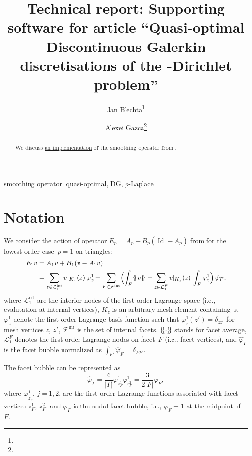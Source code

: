\documentclass[oneeqnum]{siamart220329}
\title{%
  Technical report: Supporting software for article
  ``Quasi-optimal Discontinuous Galerkin discretisations of the \mathp-Dirichlet problem''
}
\author{%
    Jan Blechta\thanks{\email{blechta@karlin.mff.cuni.cz}}
    \and
    Alexei Gazca\thanks{\email{alexei.gazca@mathematik.uni-freiburg.de}}
}
\newcommand*{\ldblbrace}{\{\mskip-5mu\{}
\newcommand*{\rdblbrace}{\}\mskip-5mu\}}
\begin{document}
\maketitle


\begin{abstract}
  We discuss \href{https://github.com/blechta/quasioptimal-dg-p-laplace}{an
  implementation} of the smoothing operator from
  \cite{veeser-zanotti-ii,veeser-zanotti-iii}.
\end{abstract}


\begin{keywords}
  smoothing operator, quasi-optimal, DG, $p$-Laplace
\end{keywords}




\tableofcontents


\section{Notation}
%
We consider the action of operator $E_p = A_p - B_p(\operatorname{Id}{}-A_p)$ from
\cite{veeser-zanotti-ii,veeser-zanotti-iii} for the lowest-order case~$p=1$
on triangles:
%
\begin{align*}
  E_1 v
  & = A_1 v + B_1 (v - A_1 v) \\
  & = \sum_{z\in\mathcal{L}^{\mathrm{int}}_1} v|_{K_z}(z) \, \varphi^1_z
    + \sum_{F\in \mathcal{F}^{\mathrm{int}}} \Bigl( \int_F \ldblbrace v
        \rdblbrace - \sum_{z\in\mathcal{L}^F_1} v|_{K_z}(z) \, \int_F \varphi_z^1
        \Bigr) \, \hat\varphi_F,
\end{align*}
%
where $\mathcal{L}^{\mathrm{int}}_1$ are the interior nodes of the first-order
Lagrange space (i.e., evalutation at internal vertices),
$K_z$ is an arbitrary mesh element containing~$z$,
$\varphi^1_z$ denote the first-order Lagrange basis function such that $\varphi^1_z(z')=\delta_{zz'}$ for mesh vertices $z$, $z'$,
$\mathcal{F}^{\mathrm{int}}$ is the set of internal facets,
$\ldblbrace\cdot\rdblbrace$ stands for facet average,
$\mathcal{L}^F_1$ denotes the first-order Lagrange nodes on facet~$F$ (i.e., facet vertices),
and
$\hat\varphi_F$ is the facet bubble normalized as $\int_{F'} \hat\varphi_F = \delta_{FF'}$.

The facet bubble can be represented as
%
\begin{equation}
  \label{eq:facet_bubbles}
  \hat\varphi_F
  = \frac{6}{|F|} \varphi^1_{z_F^1} \varphi^1_{z_F^2}
  = \frac{3}{2|F|} \varphi_F,
\end{equation}
%
where $\varphi^1_{z_F^j}$, $j=1,2$, are the first-order Lagrange functions
associated with facet vertices $z_F^1$, $z_F^2$, and $\varphi_F$ is the nodal
facet bubble, i.e., $\varphi_F=1$ at the midpoint of~$F$.
\end{document}
